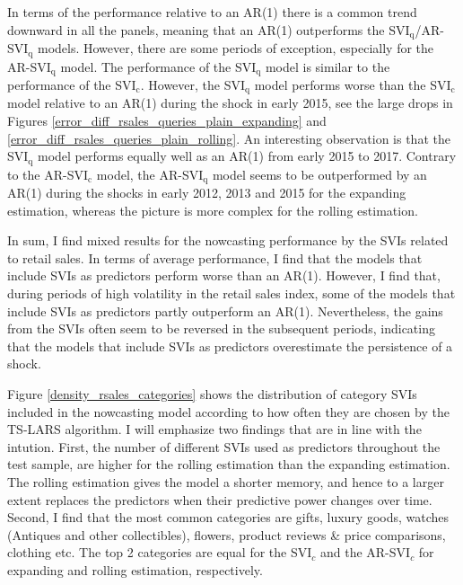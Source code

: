 In terms of the performance relative to an AR(1) there is a common trend downward in all the panels, meaning that an AR(1) outperforms the SVI$_\text{q}$/AR-SVI$_\text{q}$ models. However, there are some periods of exception, especially for the AR-SVI$_\text{q}$ model. The performance of the SVI$_\text{q}$ model is similar to the performance of the SVI$_\text{c}$. However, the SVI$_\text{q}$ model performs worse than the SVI$_\text{c}$ model relative to an AR(1) during the shock in early 2015, see the large drops in Figures \ref{error_diff_rsales_queries_plain_expanding} and \ref{error_diff_rsales_queries_plain_rolling}. An interesting observation is that the SVI$_\text{q}$ model performs equally well as an AR(1) from early 2015 to 2017. Contrary to the AR-SVI$_\text{c}$ model, the AR-SVI$_\text{q}$ model seems to be outperformed by an AR(1) during the shocks in early 2012, 2013 and 2015 for the expanding estimation, whereas the picture is more complex for the rolling estimation.

In sum, I find mixed results for the nowcasting performance by the SVIs related to retail sales. In terms of average performance, I find that the models that include SVIs as predictors perform worse than an AR(1). However, I find that, during periods of high volatility in the retail sales index, some of the models that include SVIs as predictors partly outperform an AR(1). Nevertheless, the gains from the SVIs often seem to be reversed in the subsequent periods, indicating that the models that include SVIs as predictors overestimate the persistence of a shock.

Figure \ref{density_rsales_categories} shows the distribution of category SVIs included in the nowcasting model according to how often they are chosen by the TS-LARS algorithm. I will emphasize two findings that are in line with the intution. First, the number of different SVIs used as predictors throughout the test sample, are higher for the rolling estimation than the expanding estimation. The rolling estimation gives the model a shorter memory, and hence to a larger extent replaces the predictors when their predictive power changes over time. Second, I find that the most common categories are gifts, luxury goods, watches (Antiques and other collectibles), flowers, product reviews \& price comparisons, clothing etc. The top 2 categories are equal for the SVI$_c$ and the AR-SVI$_c$ for expanding and rolling estimation, respectively.

